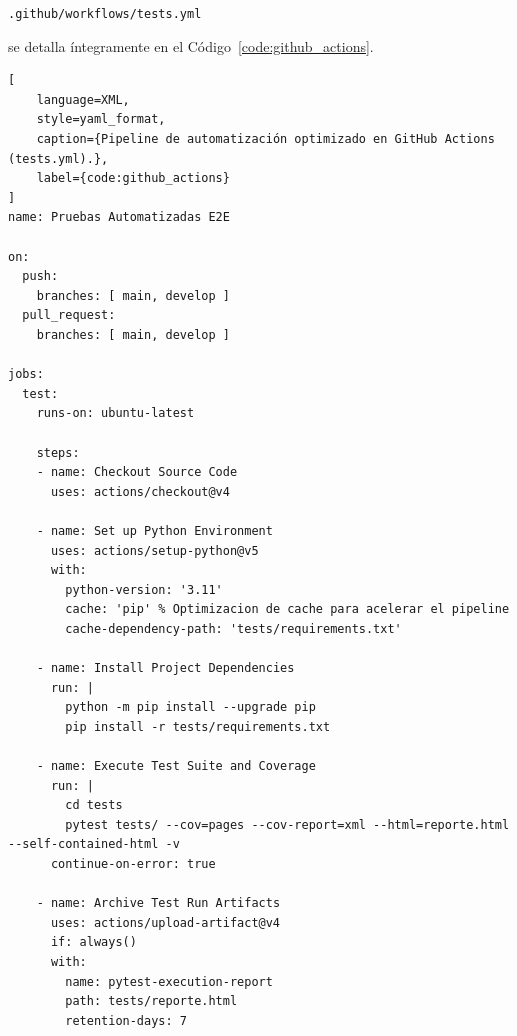 \documentclass[12pt]{article}
\begin{document}
\begin{center}
    \texttt{.github/workflows/tests.yml}
\end{center}

se detalla íntegramente en el Código~\ref{code:github_actions}.

\begin{lstlisting}[
    language=XML,
    style=yaml_format,
    caption={Pipeline de automatización optimizado en GitHub Actions (tests.yml).},
    label={code:github_actions}
]
name: Pruebas Automatizadas E2E

on:
  push:
    branches: [ main, develop ]
  pull_request:
    branches: [ main, develop ]

jobs:
  test:
    runs-on: ubuntu-latest
    
    steps:
    - name: Checkout Source Code
      uses: actions/checkout@v4

    - name: Set up Python Environment
      uses: actions/setup-python@v5
      with:
        python-version: '3.11'
        cache: 'pip' % Optimizacion de cache para acelerar el pipeline
        cache-dependency-path: 'tests/requirements.txt'

    - name: Install Project Dependencies
      run: |
        python -m pip install --upgrade pip
        pip install -r tests/requirements.txt

    - name: Execute Test Suite and Coverage
      run: |
        cd tests
        pytest tests/ --cov=pages --cov-report=xml --html=reporte.html --self-contained-html -v
      continue-on-error: true

    - name: Archive Test Run Artifacts
      uses: actions/upload-artifact@v4
      if: always()
      with:
        name: pytest-execution-report
        path: tests/reporte.html
        retention-days: 7
\end{lstlisting}
\end{document}

